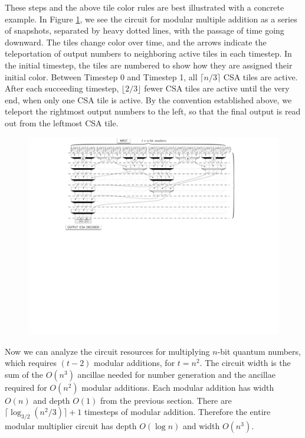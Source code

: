 \documentclass[twoside]{article}
\begin{document}
These steps and the above tile color rules are best illustrated with a concrete
example. In Figure \ref{fig:mod-mult}, we see the circuit for modular
multiple addition as a series of
snapshots, separated by heavy dotted lines, with the passage of time going
downward. The tiles change color over time, and the arrows indicate the
teleportation of output numbers to neighboring active tiles in each timestep.
In the initial timestep, the tiles are numbered to show how they are assigned
their initial color.
Between Timestep 0 and Timestep 1,
all $\lceil n/3 \rceil$ CSA tiles are active. After each succeeding timestep,
$\lfloor 2/3 \rfloor$
fewer CSA tiles are active until the very end, when only one CSA tile is
active. By the convention established above,
we teleport the rightmost output numbers to the left, so that the
final output is read out from the leftmost CSA tile.

\begin{figure}[htb!]
\centerline{
\includegraphics[width=5.5in]{./mod-mult-add.pdf}
}
\label{fig:mod-mult}
\end{figure}
%

Now we can analyze the circuit resources for multiplying $n$-bit
quantum numbers, which requires $(t-2)$ modular additions, for $t=n^2$.
The circuit width is the sum of the $O(n^3)$ ancillae
needed for number generation and the ancillae required for $O(n^2)$
modular additions. Each modular addition has width $O(n)$ and depth $O(1)$
from the previous
section. There are
$\lceil \log_{3/2}(n^2 / 3) \rceil +1 $ timesteps of modular addition. Therefore
the entire modular multiplier circuit has depth $O(\log n)$ and width $O(n^3)$.
\end{document}
